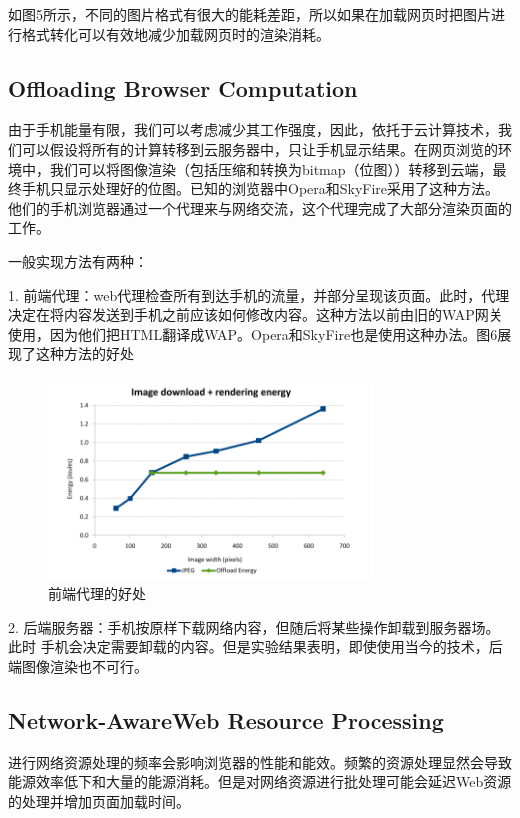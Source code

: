 \documentclass{sig-alternate-05-2015}
\begin{document}
如图5\cite{13}所示，不同的图片格式有很大的能耗差距，所以如果在加载网页时把图片进行格式转化可以有效地减少加载网页时的渲染消耗。

\subsection{Offloading Browser Computation}

由于手机能量有限，我们可以考虑减少其工作强度，因此，依托于云计算技术，我们可以假设将所有的计算转移到云服务器中，只让手机显示结果。在网页浏览的环境中，我们可以将图像渲染（包括压缩和转换为bitmap（位图））转移到云端，最终手机只显示处理好的位图。已知的浏览器中Opera和SkyFire采用了这种方法。他们的手机浏览器通过一个代理来与网络交流，这个代理完成了大部分渲染页面的工作。

一般实现方法有两种：

1.	前端代理：web代理检查所有到达手机的流量，并部分呈现该页面。此时，代理决定在将内容发送到手机之前应该如何修改内容。这种方法以前由旧的WAP网关使用，因为他们把HTML翻译成WAP。Opera和SkyFire也是使用这种办法。图6\cite{13}展现了这种方法的好处

\begin{figure}[htbp]
	\centering
	\includegraphics[width=3.4in]{./figure5}
	\caption{前端代理的好处}\label{fig:tasks}
\end{figure}

2.	后端服务器：手机按原样下载网络内容，但随后将某些操作卸载到服务器场。 此时
手机会决定需要卸载的内容。但是实验结果表明，即使使用当今的技术，后端图像渲染也不可行。

\subsection{Network-AwareWeb Resource Processing}

进行网络资源处理的频率会影响浏览器的性能和能效。频繁的资源处理显然会导致能源效率低下和大量的能源消耗。但是对网络资源进行批处理可能会延迟Web资源的处理并增加页面加载时间。
\end{document}
